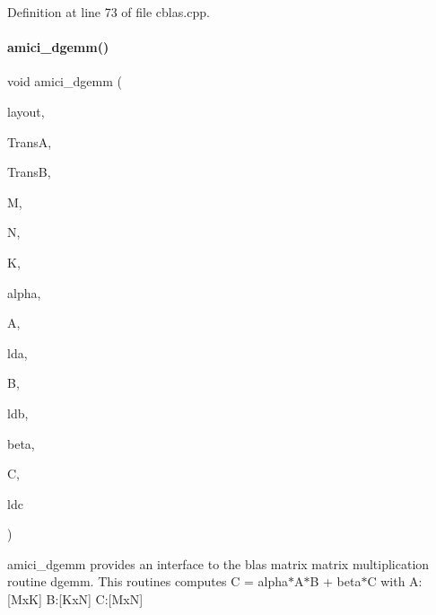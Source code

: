 Definition at line 73 of file cblas.\+cpp.

\mbox{\label{namespaceamici_a235c0cbd2185cc7351ea9c126e498bd9}} 
\paragraph{\texorpdfstring{amici\+\_\+dgemm()}{amici\_dgemm()}}
{\footnotesize\ttfamily void amici\+\_\+dgemm (\begin{DoxyParamCaption}\item[{\mbox{\hyperlink{namespaceamici_a3ec6460bb4e7f6100a15d18627a3ff3e}{B\+L\+A\+S\+Layout}}}]{layout,  }\item[{\mbox{\hyperlink{namespaceamici_a0f0ec77c6c8f48d9c5cb50d54899afae}{B\+L\+A\+S\+Transpose}}}]{TransA,  }\item[{\mbox{\hyperlink{namespaceamici_a0f0ec77c6c8f48d9c5cb50d54899afae}{B\+L\+A\+S\+Transpose}}}]{TransB,  }\item[{const int}]{M,  }\item[{const int}]{N,  }\item[{const int}]{K,  }\item[{const double}]{alpha,  }\item[{const double $\ast$}]{A,  }\item[{const int}]{lda,  }\item[{const double $\ast$}]{B,  }\item[{const int}]{ldb,  }\item[{const double}]{beta,  }\item[{double $\ast$}]{C,  }\item[{const int}]{ldc }\end{DoxyParamCaption})}

amici\+\_\+dgemm provides an interface to the blas matrix matrix multiplication routine dgemm. This routines computes C = alpha$\ast$\+A$\ast$B + beta$\ast$C with A\+: \mbox{[}MxK\mbox{]} B\+:\mbox{[}KxN\mbox{]} C\+:\mbox{[}MxN\mbox{]}


